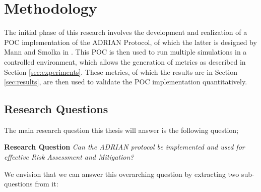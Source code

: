 \section{Methodology}
\label{sec:methodology}
The initial phase of this research involves the development and realization of a POC implementation of the ADRIAN Protocol, of which the latter is designed by Mann and Smolka in \cite{mann2023ADRIAN}. This POC is then used to run multiple simulations in a controlled environment, which allows the generation of metrics as described in Section \ref{sec:experiments}. These metrics, of which the results are in Section \ref{sec:results}, are then used to validate the POC implementation quantitatively. 


\subsection{Research Questions}
\label{ssec:research-questions}

The main research question this thesis will answer is the following question;

\vspace{0.5em}
\textbf{Research Question}\label{rq} \emph{Can the ADRIAN protocol be implemented and used for effective Risk Assessment and Mitigation?}\vspace{1em}

We envision that we can answer this overarching question by extracting two sub-questions from it:



